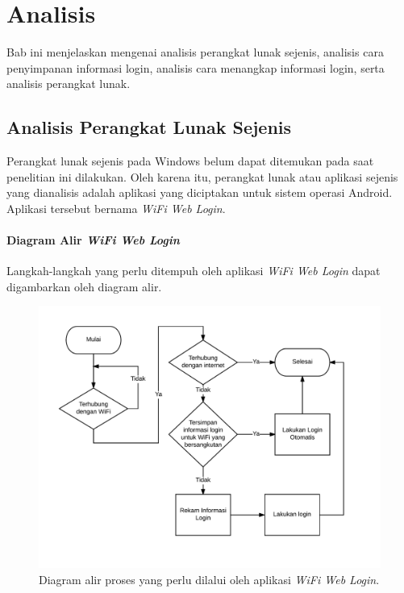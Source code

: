 \chapter{Analisis}
\label{chap:analisis}

Bab ini menjelaskan mengenai analisis perangkat lunak sejenis, analisis cara penyimpanan informasi login, analisis cara menangkap informasi login, serta analisis perangkat lunak.



\section{Analisis Perangkat Lunak Sejenis}
\label{sec:perangkat_lunak_sejenis}

Perangkat lunak sejenis pada Windows belum dapat ditemukan pada saat penelitian ini dilakukan. Oleh karena itu, perangkat lunak atau aplikasi sejenis yang dianalisis adalah aplikasi yang diciptakan untuk sistem operasi Android. Aplikasi tersebut bernama \textit{WiFi Web Login}.


\subsubsection{Diagram Alir \textit{WiFi Web Login}}
\label{subsubsec:diagram_alir_wifi_web_login}

Langkah-langkah yang perlu ditempuh oleh aplikasi \textit{WiFi Web Login} dapat digambarkan oleh diagram alir.

\begin{figure}[h]
    \centering
    \includegraphics[scale=0.85]{Gambar/WifiWebLogin.png}
    \caption[Diagram alir proses yang perlu dilalui oleh aplikasi \textit{WiFi Web Login}.]{Diagram alir proses yang perlu dilalui oleh aplikasi \textit{WiFi Web Login}.} 
    \label{fig:wifiweblogin}
\end{figure}

